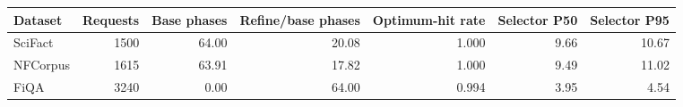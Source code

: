 \begin{tabular}{lrrrrrr}
\toprule
Dataset & Requests & Base phases & Refine/base phases & Optimum-hit rate & Selector P50 & Selector P95\\
\midrule
SciFact & 1500 & 64.00 & 20.08 & 1.000 & 9.66 & 10.67\\
NFCorpus & 1615 & 63.91 & 17.82 & 1.000 & 9.49 & 11.02\\
FiQA & 3240 & 0.00 & 64.00 & 0.994 & 3.95 & 4.54\\
\bottomrule
\end{tabular}
